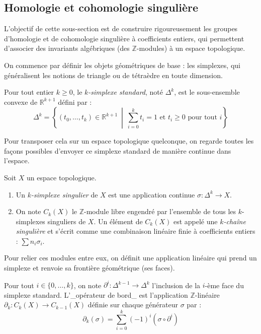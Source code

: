 \subsection{Homologie et cohomologie singulière}

L'objectif de cette sous-section est de construire rigoureusement les groupes d'homologie et de cohomologie singulière à coefficients entiers, qui permettent d'associer des invariants algébriques (des $\mathbb{Z}$-modules) à un espace topologique.

On commence par définir les objets géométriques de base : les simplexes, qui généralisent les notions de triangle ou de tétraèdre en toute dimension.

\begin{definition}
Pour tout entier $k \geq 0$, le \emph{$k$-simplexe standard}, noté $\Delta^k$, est le sous-ensemble convexe de $\mathbb{R}^{k+1}$ défini par :
\[
\Delta^k = \left\{ (t_0, \dots, t_k) \in \mathbb{R}^{k+1} \ \middle|\  \sum_{i=0}^k t_i = 1 \text{ et } t_i \geq 0 \text{ pour tout } i \right\}\]
\end{definition}

Pour transposer cela sur un espace topologique quelconque, on regarde toutes les façons possibles d'envoyer ce simplexe standard de manière continue dans l'espace.

\begin{definition}
Soit $X$ un espace topologique. 
\begin{enumerate}
    \item Un \emph{$k$-simplexe singulier} de $X$ est une application continue $\sigma : \Delta^k \to X$.
    \item On note $C_k(X)$ le $\mathbb{Z}$-module libre engendré par l'ensemble de tous les $k$-simplexes singuliers de $X$. Un élément de $C_k(X)$ est appelé une \emph{$k$-chaîne singulière} et s'écrit comme une combinaison linéaire finie à coefficients entiers : $\sum n_i \sigma_i$.
\end{enumerate}
\end{definition}

Pour relier ces modules entre eux, on définit une application linéaire qui prend un simplexe et renvoie sa frontière géométrique (ses faces).

\begin{definition}
Pour tout $i \in \{0, \dots, k\}$, on note $\partial^i : \Delta^{k-1} \to \Delta^k$ l'inclusion de la $i$-ème face du simplexe standard. L'\_opérateur de bord\_ est l'application $\mathbb{Z}$-linéaire $\partial_k : C_k(X) \to C_{k-1}(X)$ définie sur chaque générateur $\sigma$ par :
\[
\partial_k(\sigma) = \sum_{i=0}^k (-1)^i (\sigma \circ \partial^i)
\]
\end{definition}

